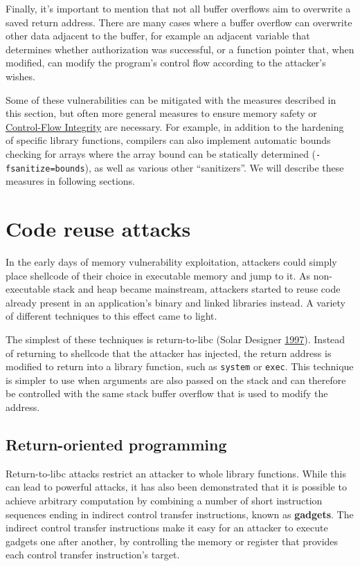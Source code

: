 \documentclass[a4paper,]{report}
\begin{document}
Finally, it's important to mention that not all buffer overflows aim to
overwrite a saved return address. There are many cases where a buffer
overflow can overwrite other data adjacent to the buffer, for example an
adjacent variable that determines whether authorization was successful,
or a function pointer that, when modified, can modify the program's
control flow according to the attacker's wishes.

Some of these vulnerabilities can be mitigated with the measures
described in this section, but often more general measures to ensure
memory safety or \protect\hyperlink{cfi}{Control-Flow Integrity} are
necessary. For example, in addition to the hardening of specific library
functions, compilers can also implement automatic bounds checking for
arrays where the array bound can be statically determined
(\texttt{-fsanitize=bounds}), as well as various other ``sanitizers''.
We will describe these measures in following sections.

\hypertarget{code-reuse-attacks}{%
\section{Code reuse attacks}\label{code-reuse-attacks}}

In the early days of memory vulnerability exploitation, attackers could
simply place shellcode of their choice in executable
memory and jump to it. As non-executable stack and heap became
mainstream, attackers started to reuse code already present in an
application's binary and linked libraries instead. A variety of
different techniques to this effect came to light.

The simplest of these techniques is return-to-libc (Solar Designer
\protect\hyperlink{ref-Solar1997}{1997}). Instead of returning to
shellcode that the attacker has injected, the return address is modified
to return into a library function, such as \texttt{system} or
\texttt{exec}. This technique is simpler to use when arguments are also
passed on the stack and can therefore be controlled with the same stack
buffer overflow that is used to modify the address.

\hypertarget{return-oriented-programming}{%
\subsection{Return-oriented
programming}\label{return-oriented-programming}}

Return-to-libc attacks restrict an attacker to whole library functions.
While this can lead to powerful attacks, it has also been demonstrated
that it is possible to achieve arbitrary computation by combining a
number of short instruction sequences ending in indirect control
transfer instructions, known as \textbf{gadgets}. The
indirect control transfer instructions make it easy for an attacker to
execute gadgets one after another, by controlling the memory or register
that provides each control transfer instruction's target.
\end{document}
